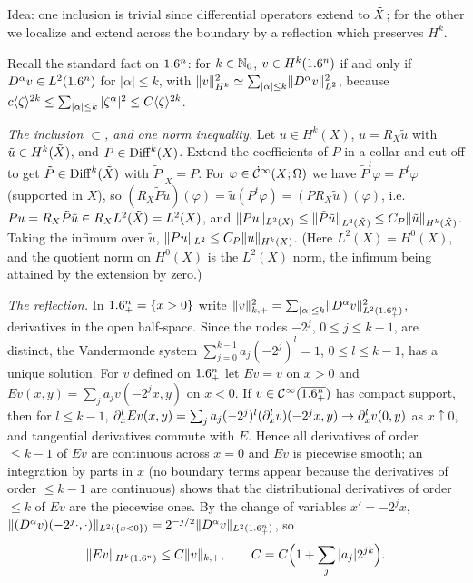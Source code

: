 \subsection*{}
Idea: one inclusion is trivial since differential operators extend to $\tilde{X}$; for the other
we localize and extend across the boundary by a reflection which preserves $H^k$.

Recall the standard fact on $1.6^n$: for $k\in\mathbb{N}_0$, $v\in H^k(1.6^n)$ if and only if
$D^\alpha v\in L^2(1.6^n)$ for $|\alpha|\le k$, with $\lVert v\rVert_{H^k}^2\simeq\sum_{|\alpha|
\le k}\lVert D^\alpha v\rVert^2_{L^2}$, because $c\langle \zeta\rangle^{2k}\le\sum_{|\alpha|\le k}
|\zeta^\alpha|^2\le C\langle \zeta\rangle^{2k}$.

\emph{The inclusion $\subset$, and one norm inequality.} Let $u\in H^k(X)$, $u=R_X\tilde u$
with $\tilde u\in H^k(\tilde{X})$, and $P\in\operatorname{Diff}^{k}(X)$. Extend the coefficients of $P$ in a
collar and cut off to get $\tilde P\in\operatorname{Diff}^{k}(\tilde{X})$ with $\tilde P|_X=P$. For
$\varphi\in\dot{\mathcal{C}}^\infty(X;\Omega)$ we have $\tilde P^t\varphi=P^t\varphi$ (supported in $X$), so
$(R_X\tilde P\tilde u)(\varphi)=\tilde u(P^t\varphi)=(PR_X\tilde u)(\varphi)$, i.e.\
$Pu=R_X\tilde P\tilde u\in R_XL^2(\tilde{X})=L^2(X)$, and $\lVert Pu\rVert_{L^2(X)}\le
\lVert \tilde P\tilde u\rVert_{L^2(\tilde{X})}\le C_P\lVert \tilde u\rVert_{H^k(\tilde{X})}$. Taking the infimum
over $\tilde u$, $\lVert Pu\rVert_{L^2}\le C_P\lVert u\rVert_{H^k(X)}$. (Here $L^2(X)=H^0(X)$, and the
quotient norm on $H^0(X)$ is the $L^2(X)$ norm, the infimum being attained by the extension
by zero.)

\emph{The reflection.} In $1.6^n_+=\{x>0\}$ write $\lVert v\rVert_{k,+}^2=\sum_{|\alpha|\le k}
\lVert D^\alpha v\rVert^2_{L^2(1.6^n_+)}$, derivatives in the open half-space. Since the nodes
$-2^j$, $0\le j\le k-1$, are distinct, the Vandermonde system $\sum_{j=0}^{k-1}a_j(-2^j)^l=1$,
$0\le l\le k-1$, has a unique solution. For $v$ defined on $1.6^n_+$ let $Ev=v$ on $x>0$
and $Ev(x,y)=\sum_ja_jv(-2^jx,y)$ on $x<0$. If $v\in\mathcal{C}^\infty(\overline{1.6^n_+})$ has compact
support, then for $l\le k-1$, $\partial_x^lEv(x,y)=\sum_ja_j(-2^j)^l(\partial_x^lv)(-2^jx,y)\to
\partial_x^lv(0,y)$ as $x\uparrow0$, and tangential derivatives commute with $E$. Hence all
derivatives of order $\le k-1$ of $Ev$ are continuous across $x=0$ and $Ev$ is piecewise
smooth; an integration by parts in $x$ (no boundary terms appear because the derivatives of
order $\le k-1$ are continuous) shows that the distributional derivatives of order $\le k$
of $Ev$ are the piecewise ones. By the change of variables $x'=-2^jx$,
$\lVert (D^\alpha v)(-2^j\cdot,\cdot)\rVert_{L^2(\{x<0\})}=2^{-j/2}\lVert D^\alpha v\rVert_{L^2(1.6^n_+)}$,
so
\begin{equation*}
\lVert Ev\rVert_{H^k(1.6^n)}\le C\lVert v\rVert_{k,+},\qquad C=C\Big(1+\sum_j|a_j|2^{jk}\Big).
\end{equation*}

